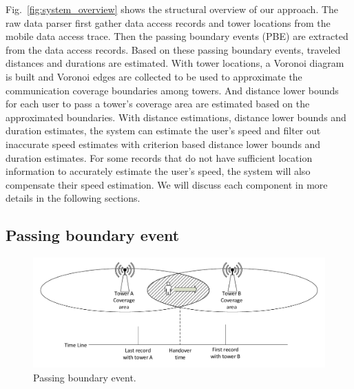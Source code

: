 Fig.~\ref{fig:system_overview} shows the structural overview of our approach. The raw data parser first gather data access records and tower locations from the mobile data access trace. Then the passing boundary events (PBE) are extracted from the data access records. Based on these passing boundary events, traveled distances and durations are estimated. With tower locations, a Voronoi diagram is built and Voronoi edges are collected to be used to approximate the communication coverage boundaries among towers. And distance lower bounds for each user to pass a tower's coverage area are estimated based on the approximated boundaries. With distance estimations, distance lower bounds and duration estimates, the system can estimate the user's speed and filter out inaccurate speed estimates with criterion based distance lower bounds and duration estimates. For some records that do not have sufficient location information to accurately estimate the user's speed, the system will also compensate their speed estimation. We will discuss each component in more details in the following sections.

\subsection{Passing boundary event}

\begin{figure}[h]
    \centering
    \includegraphics[width=\linewidth]{./figures/passing_boundary.pdf}
    \caption{Passing boundary event.}
    \label{fig:pass_bound}
\end{figure}

